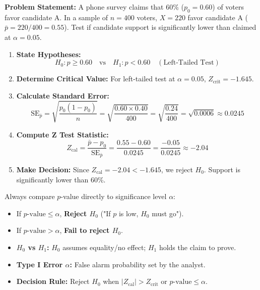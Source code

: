 \documentclass[10pt,a4paper]{article}
\newenvironment{steps}{
  \begin{enumerate}[label=\textbf{Step \arabic*:}, leftmargin=*]
}{
  \end{enumerate}
}
\begin{document}
\begin{worked}
\textbf{Problem Statement:} A phone survey claims that 60\% ($p_0 = 0.60$) of voters favor candidate A. In a sample of $n = 400$ voters, $X = 220$ favor candidate A ($\bar{p} = 220/400 = 0.55$). Test if candidate support is significantly lower than claimed at $\alpha = 0.05$.

\begin{steps}
\item \textbf{State Hypotheses:}
\[
H_0: p \ge 0.60 \quad \text{vs} \quad H_1: p < 0.60 \quad (\text{Left-Tailed Test})
\]
\item \textbf{Determine Critical Value:} For left-tailed test at $\alpha = 0.05$, $Z_{\text{crit}} = -1.645$.
\item \textbf{Calculate Standard Error:}
\[
\text{SE}_{\bar{p}} = \sqrt{\frac{p_0(1-p_0)}{n}} = \sqrt{\frac{0.60 \times 0.40}{400}} = \sqrt{\frac{0.24}{400}} = \sqrt{0.0006} \approx 0.0245
\]
\item \textbf{Compute Z Test Statistic:}
\[
Z_{\text{cal}} = \frac{\bar{p} - p_0}{\text{SE}_{\bar{p}}} = \frac{0.55 - 0.60}{0.0245} = \frac{-0.05}{0.0245} \approx -2.04
\]
\item \textbf{Make Decision:} Since $Z_{\text{cal}} = -2.04 < -1.645$, we reject $H_0$. Support is significantly lower than 60\%.
\end{steps}
\end{worked}

\begin{watchout}
Always compare $p$-value directly to significance level $\alpha$:
\begin{itemize}
  \item If $p\text{-value} \le \alpha$, \textbf{Reject $H_0$} ("If $p$ is low, $H_0$ must go").
  \item If $p\text{-value} > \alpha$, \textbf{Fail to reject $H_0$}.
\end{itemize}
\end{watchout}

\begin{keytake}
\begin{itemize}
  \item \textbf{$H_0$ vs $H_1$:} $H_0$ assumes equality/no effect; $H_1$ holds the claim to prove.
  \item \textbf{Type I Error $\alpha$:} False alarm probability set by the analyst.
  \item \textbf{Decision Rule:} Reject $H_0$ when $|Z_{\text{cal}}| > Z_{\text{crit}}$ or $p\text{-value} \le \alpha$.
\end{itemize}
\end{keytake}
\end{document}
